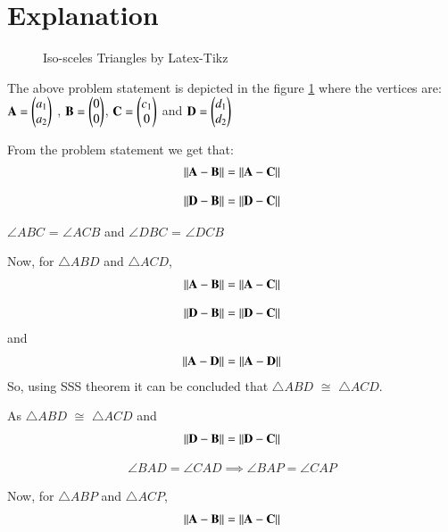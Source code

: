 \documentclass[journal,12pt,twocolumn]{IEEEtran}
\begin{document}
\section{Explanation}
\begin{figure}[!ht]
\centering
\resizebox{\columnwidth}{!}{}
\caption{Iso-sceles Triangles by Latex-Tikz}
\label{fig:iso_scelen}	
\end{figure}

The above problem statement is depicted in the figure \ref{fig:iso_scelen} where the vertices are: $\mathbf{A} = \begin{pmatrix}a_1\\a_2\end{pmatrix}$ , $\mathbf{B} = \begin{pmatrix}0\\0\end{pmatrix}$, $\mathbf{C} = \begin{pmatrix}c_1\\0\end{pmatrix}$ and $\mathbf{D} = \begin{pmatrix}d_1\\d_2\end{pmatrix}$

From the problem statement we get that:
\begin{align}
\left\lVert\mathbf{A}-\mathbf{B}\right\rVert = \left\lVert\mathbf{A}-\mathbf{C}\right\rVert
\end{align}

\begin{align}
\left\lVert\mathbf{D}-\mathbf{B}\right\rVert = \left\lVert\mathbf{D}-\mathbf{C}\right\rVert
\end{align}

$\angle ABC$ = $\angle ACB$ and $\angle DBC$ = $\angle DCB$

Now, for $\triangle ABD$ and $\triangle ACD$,
\begin{align}
\left\lVert\mathbf{A}-\mathbf{B}\right\rVert = \left\lVert\mathbf{A}-\mathbf{C}\right\rVert
\end{align}

\begin{align}
\left\lVert\mathbf{D}-\mathbf{B}\right\rVert = \left\lVert\mathbf{D}-\mathbf{C}\right\rVert
\end{align}
 and 
\begin{align}
\left\lVert\mathbf{A}-\mathbf{D}\right\rVert = \left\lVert\mathbf{A}-\mathbf{D}\right\rVert
\end{align}
So, using SSS theorem it can be concluded that $\triangle ABD$ $\cong$ $\triangle ACD$.

As $\triangle ABD$ $\cong$ $\triangle ACD$ and 
\begin{align}
\left\lVert\mathbf{D}-\mathbf{B}\right\rVert = \left\lVert\mathbf{D}-\mathbf{C}\right\rVert
\end{align}

\begin{align}
\angle BAD = \angle CAD
\implies \angle BAP = \angle CAP
\end{align}

Now, for $\triangle ABP$ and $\triangle ACP$,
\begin{align}
\left\lVert\mathbf{A}-\mathbf{B}\right\rVert = \left\lVert\mathbf{A}-\mathbf{C}\right\rVert
\end{align}
\end{document}
